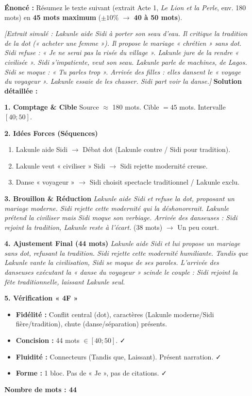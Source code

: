\documentclass[11pt]{article}
\begin{document}
\begin{exoresolu}
    \textbf{Énoncé :} Résumez le texte suivant (extrait Acte 1, \emph{Le Lion et la Perle}, env. 180 mots) en \textbf{45 mots maximum} ($\pm 10\%$ $\rightarrow$ \textbf{40 à 50 mots}).
    
    \textit{[Extrait simulé : Lakunle aide Sidi à porter son seau d'eau. Il critique la tradition de la dot (« acheter une femme »). Il propose le mariage « chrétien » sans dot. Sidi refuse : « Je ne serai pas la risée du village ». Lakunle jure de la rendre « civilisée ». Sidi s'impatiente, veut son seau. Lakunle parle de machines, de Lagos. Sidi se moque : « Tu parles trop ». Arrivée des filles : elles dansent le « voyage du voyageur ». Lakunle essaie de les chasser. Sidi part voir la danse.]}
    \tcblower
    \textbf{Solution détaillée :}
    
    \textbf{1. Comptage \& Cible}
    Source $\approx$ 180 mots. Cible $= 45$ mots. Intervalle $[40; 50]$.
    
    \textbf{2. Idées Forces (Séquences)}
    \begin{enumerate}
        \item Lakunle aide Sidi $\rightarrow$ Débat dot (Lakunle contre / Sidi pour tradition).
        \item Lakunle veut « civiliser » Sidi $\rightarrow$ Sidi rejette modernité creuse.
        \item Danse « voyageur » $\rightarrow$ Sidi choisit spectacle traditionnel / Lakunle exclu.
    \end{enumerate}
    
    \textbf{3. Brouillon \& Réduction}
    \emph{Lakunle aide Sidi et refuse la dot, proposant un mariage moderne. Sidi rejette cette modernité qui la déshonorerait. Lakunle prétend la civiliser mais Sidi moque son verbiage. Arrivée des danseuses : Sidi rejoint la tradition, Lakunle reste à l'écart.} (38 mots) $\rightarrow$ Un peu court.
    
    \textbf{4. Ajustement Final (44 mots)}
    \emph{Lakunle aide Sidi et lui propose un mariage sans dot, refusant la tradition. Sidi rejette cette modernité humiliante. Tandis que Lakunle vante la civilisation, Sidi se moque de ses paroles. L'arrivée des danseuses exécutant la « danse du voyageur » scinde le couple : Sidi rejoint la fête traditionnelle, laissant Lakunle seul.}
    
    \textbf{5. Vérification « 4F »}
    \begin{itemize}
        \item \textbf{Fidélité :} Conflit central (dot), caractères (Lakunle moderne/Sidi fière/tradition), chute (danse/séparation) présents.
        \item \textbf{Concision :} 44 mots $\in [40; 50]$. ✓
        \item \textbf{Fluidité :} Connecteurs (Tandis que, Laissant). Présent narration. ✓
        \item \textbf{Forme :} 1 bloc. Pas de « Je », pas de citations. ✓
    \end{itemize}
    \textbf{Nombre de mots : 44}
\end{exoresolu}
\end{document}
